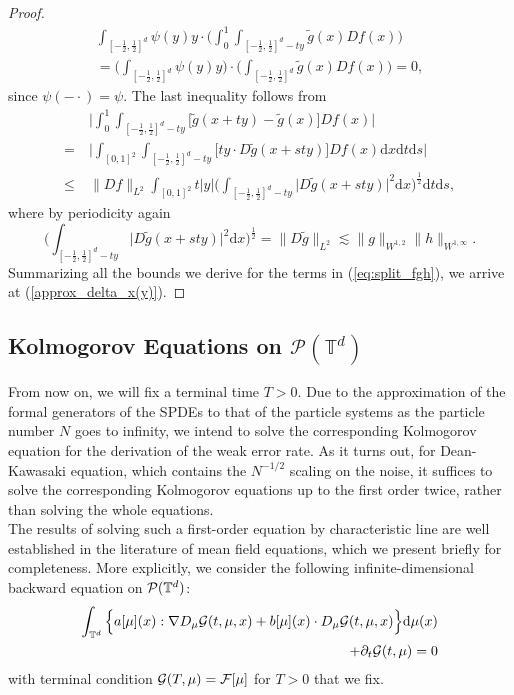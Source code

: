 \begin{proof}
\begin{align*}
\int_{[-\frac{1}{2}, \frac{1}{2}]^d}  \psi(y) y \cdot \Big(\int_0^1 \int_{[-\frac{1}{2}, \frac{1}{2}]^d - ty} \tilde{g}(x)Df(x) \Big)
\\
=  \Big(\int_{[-\frac{1}{2}, \frac{1}{2}]^d}  \psi(y) y\Big) \cdot \Big(\int_{[-\frac{1}{2}, \frac{1}{2}]^d} \tilde{g}(x)Df(x) \Big) = 0,
\end{align*} 
since $\psi(-\cdot) = \psi$. The last inequality follows from 
\begin{align*}
& \ \Big|\int_0^1 \int_{[-\frac{1}{2}, \frac{1}{2}]^d - ty} \big[\tilde{g}(x + ty) - \tilde{g}(x)\big] Df(x)\Big|\\
= & \   \Big|\int_{[0,1]^2} \int_{[-\frac{1}{2}, \frac{1}{2}]^d - ty}  \big[ty \cdot D\tilde{g}(x + sty) \big]  Df(x)\mathrm{d}x \mathrm{d}t\mathrm{d}s\Big|\\
\leq & \  \|Df\|_{L^2}  \int_{[0,1]^2} t|y| \Big(\int_{[-\frac{1}{2}, \frac{1}{2}]^d - ty}  \big|D\tilde{g}(x + sty) \big|^2  \mathrm{d}x\Big)^{\frac{1}{2}}\mathrm{d}t\mathrm{d}s,
\end{align*}
where by periodicity again
\[
\Big(\int_{[-\frac{1}{2}, \frac{1}{2}]^d - ty}  \big|D\tilde{g}(x + sty) \big|^2  \mathrm{d}x\Big)^{\frac{1}{2}} = \|D\tilde{g}\|_{L^2} \lesssim \|g\|_{W^{1,2}}\|h\|_{W^{1,\infty}}.
\]
Summarizing all the bounds we derive for the terms in (\ref{eq:split_fgh}), we arrive at (\ref{approx_delta_x(y)}). 
\end{proof}

\subsection{Kolmogorov Equations on $\mathcal{P}(\mathbb{T}^d)$}\label{sec:kolmo_eq}

From now on, we will fix a terminal time $T > 0$. Due to the approximation of the formal generators of the SPDEs to that of the particle systems as the particle number $N$ goes to infinity, we intend to solve the corresponding Kolmogorov equation for the derivation of the weak error rate. As it turns out, for Dean-Kawasaki equation, which contains the $N^{-1/2}$ scaling on the noise, it suffices to solve the corresponding Kolmogorov equations up to the first order twice, rather than solving the whole equations.  \\

The results of solving such a first-order equation by characteristic line are well established in the literature of mean field equations, which we present briefly for completeness. More explicitly, we consider the following infinite-dimensional backward equation on $\mathcal{P}(\mathbb{T}^d)$:
\begin{equation}\label{eq:master}
\begin{split}
\int_{\mathbb{T}^d} \Big\{a[\mu](x):\nabla D_{\mu}\mathcal{G}(t,\mu,x) + b[\mu](x)\cdot D_{\mu}\mathcal{G}(t,\mu,x)\Big\}\mathrm{d}\mu(x)\\
+ \partial_t \mathcal{G}(t,\mu) = 0
\end{split}
\end{equation}
with terminal condition $\mathcal{G}(T,\mu) = \mathcal{F}[\mu]$ for $T > 0$ that we fix.

